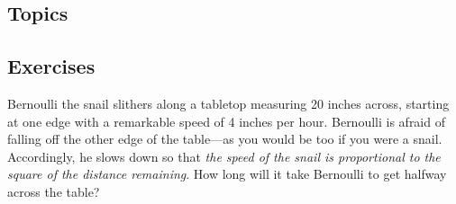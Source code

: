 \reviewSection

\subsection{Topics}

\subsection{Exercises}

\begin{exercise}
Bernoulli the snail slithers along a tabletop measuring 20 inches across, starting at one edge with a remarkable speed of 4 inches per hour. Bernoulli is afraid of falling off the other edge of the table---as you would be too if you were a snail. Accordingly, he slows down so that {\it the speed of the snail is proportional to the square of the distance remaining}. How long will it take Bernoulli to get halfway across the table? %
\end{exercise}